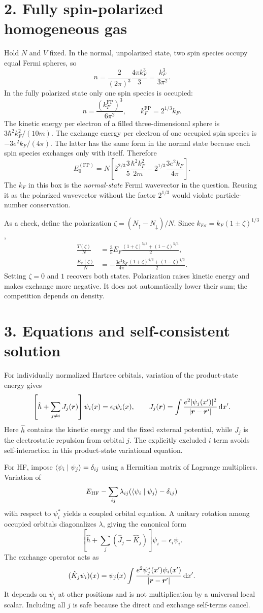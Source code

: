 \section*{2. Fully spin-polarized homogeneous gas}
Hold $N$ and $V$ fixed. In the normal, unpolarized state, two spin species occupy equal Fermi spheres, so
\[
n=\frac{2}{(2\pi)^3}\frac{4\pi k_F^3}{3}
 =\frac{k_F^3}{3\pi^2}.
\]
In the fully polarized state only one spin species is occupied:
\[
n=\frac{(k_F^{\mathrm{FP}})^3}{6\pi^2},\qquad
k_F^{\mathrm{FP}}=2^{1/3}k_F.
\]
The kinetic energy per electron of a filled three-dimensional sphere is $3\hbar^2k_F^2/(10m)$. The exchange energy per electron of one occupied spin species is $-3e^2k_F/(4\pi)$. The latter has the same form in the normal state because each spin species exchanges only with itself. Therefore
\[
\boxed{E_0^{(\mathrm{FP})}=N\left[
2^{2/3}\frac35\frac{\hbar^2k_F^2}{2m}
-2^{1/3}\frac{3e^2k_F}{4\pi}\right].}
\]
The $k_F$ in this box is the \emph{normal-state} Fermi wavevector in the question. Reusing it as the polarized wavevector without the factor $2^{1/3}$ would violate particle-number conservation.

As a check, define the polarization $\zeta=(N_\uparrow-N_\downarrow)/N$. Since $k_{F\sigma}=k_F(1\pm\zeta)^{1/3}$,
\begin{align*}
\frac{T(\zeta)}N&=\frac35E_F
\frac{(1+\zeta)^{5/3}+(1-\zeta)^{5/3}}2,\\
\frac{E_x(\zeta)}N&=-\frac{3e^2k_F}{4\pi}
\frac{(1+\zeta)^{4/3}+(1-\zeta)^{4/3}}2.
\end{align*}
Setting $\zeta=0$ and $1$ recovers both states. Polarization raises kinetic energy and makes exchange more negative. It does not automatically lower their sum; the competition depends on density.

\section*{3. Equations and self-consistent solution}
For individually normalized Hartree orbitals, variation of the product-state energy gives
\[
\left[\hat h+\sum_{j\ne i}J_j(\boldsymbol{r})\right]\psi_i(x)=\epsilon_i\psi_i(x),\qquad
J_j(\boldsymbol{r})=\int\frac{e^2|\psi_j(x')|^2}{|\boldsymbol{r}-\boldsymbol{r}'|}\mathop{}\!\mathrm{d} x'.
\]
Here $\hat h$ contains the kinetic energy and the fixed external potential, while $J_j$ is the electrostatic repulsion from orbital $j$. The explicitly excluded $i$ term avoids self-interaction in this product-state variational equation.

For HF, impose $\langle\psi_i\mid\psi_j\rangle=\delta_{ij}$ using a Hermitian matrix of Lagrange multipliers. Variation of
\[
E_{\mathrm{HF}}-\sum_{ij}\lambda_{ij}
(\langle\psi_i\mid\psi_j\rangle-\delta_{ij})
\]
with respect to $\psi_i^*$ yields a coupled orbital equation. A unitary rotation among occupied orbitals diagonalizes $\lambda$, giving the canonical form
\[
\boxed{\left[\hat h+\sum_j(\hat J_j-\hat K_j)\right]\psi_i
=\epsilon_i\psi_i.}
\]
The exchange operator acts as
\[
(\hat K_j\psi_i)(x)=\psi_j(x)\int
\frac{e^2\psi_j^*(x')\psi_i(x')}{|\boldsymbol{r}-\boldsymbol{r}'|}\mathop{}\!\mathrm{d} x'.
\]
It depends on $\psi_i$ at other positions and is not multiplication by a universal local scalar. Including all $j$ is safe because the direct and exchange self-terms cancel.

